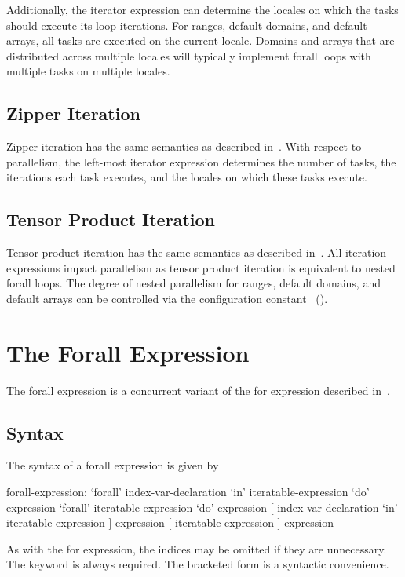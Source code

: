 Additionally, the iterator expression can determine the locales on
which the tasks should execute its loop iterations.  For ranges,
default domains, and default arrays, all tasks are executed on the
current locale.  Domains and arrays that are distributed across
multiple locales will typically implement forall loops with multiple
tasks on multiple locales.

\subsection{Zipper Iteration}
\label{forall_zipper}

Zipper iteration has the same semantics as described
in~.  With respect to parallelism, the
left-most iterator expression determines the number of tasks, the
iterations each task executes, and the locales on which these tasks
execute.

\subsection{Tensor Product Iteration}
\label{forall_tensor}

Tensor product iteration has the same semantics as described
in~.  All iteration expressions impact
parallelism as tensor product iteration is equivalent to nested forall
loops.  The degree of nested parallelism for ranges, default domains,
and default arrays can be controlled via the configuration
constant ~().

\section{The Forall Expression}
\label{Forall_Expressions}

The forall expression is a concurrent variant of the for expression
described in~.

\subsection{Syntax}
\label{forall_expr_syntax}

The syntax of a forall expression is given by
\begin{syntax}
forall-expression:
  `forall' index-var-declaration `in' iteratable-expression `do' expression
  `forall' iteratable-expression `do' expression
  [ index-var-declaration `in' iteratable-expression ] expression
  [ iteratable-expression ] expression
\end{syntax}
As with the for expression, the indices may be omitted if they are
unnecessary.  The  keyword is always required.  The bracketed
form is a syntactic convenience.


